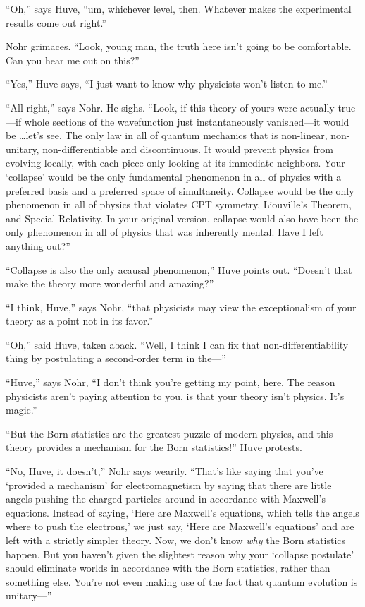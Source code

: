 {
 ``Oh,'' says Huve,
``um, whichever level, then. Whatever makes the
experimental results come out right.''}

{
 Nohr grimaces. ``Look, young man, the truth here
isn't going to be comfortable. Can you hear me out on
this?''}

{
 ``Yes,'' Huve says,
``I just want to know why physicists
won't listen to me.''}

{
 ``All right,'' says Nohr. He
sighs. ``Look, if this theory of yours were actually
true---if whole sections of the wavefunction just instantaneously
vanished---it would be \ldots let's see. The only law in
all of quantum mechanics that is non-linear, non-unitary,
non-differentiable and discontinuous. It would prevent physics from
evolving locally, with each piece only looking at its immediate
neighbors. Your `collapse' would be the
only fundamental phenomenon in all of physics with a preferred basis
and a preferred space of simultaneity. Collapse would be the only
phenomenon in all of physics that violates CPT symmetry,
Liouville's Theorem, and Special Relativity. In your
original version, collapse would also have been the only phenomenon in
all of physics that was inherently mental. Have I left anything
out?''}

{
 ``Collapse is also the only acausal
phenomenon,'' Huve points out.
``Doesn't that make the theory more
wonderful and amazing?''}

{
 ``I think, Huve,'' says Nohr,
``that physicists may view the exceptionalism of your
theory as a point not in its favor.''}

{
 ``Oh,'' said Huve, taken aback.
``Well, I think I can fix that non-differentiability
thing by postulating a second-order term in the---''}

{
 ``Huve,'' says Nohr,
``I don't think you're
getting my point, here. The reason physicists aren't
paying attention to you, is that your theory isn't
physics. It's magic.''}

{
 ``But the Born statistics are the greatest puzzle
of modern physics, and this theory provides a mechanism for the Born
statistics!'' Huve protests.}

{
 ``No, Huve, it
doesn't,'' Nohr says wearily.
``That's like saying that
you've `provided a
mechanism' for electromagnetism by saying that there
are little angels pushing the charged particles around in accordance
with Maxwell's equations. Instead of saying,
`Here are Maxwell's equations, which
tells the angels where to push the electrons,' we just
say, `Here are Maxwell's
equations' and are left with a strictly simpler theory.
Now, we don't know \textit{why} the Born statistics
happen. But you haven't given the slightest reason why
your `collapse postulate' should
eliminate worlds in accordance with the Born statistics, rather than
something else. You're not even making use of the fact
that quantum evolution is unitary---''}

